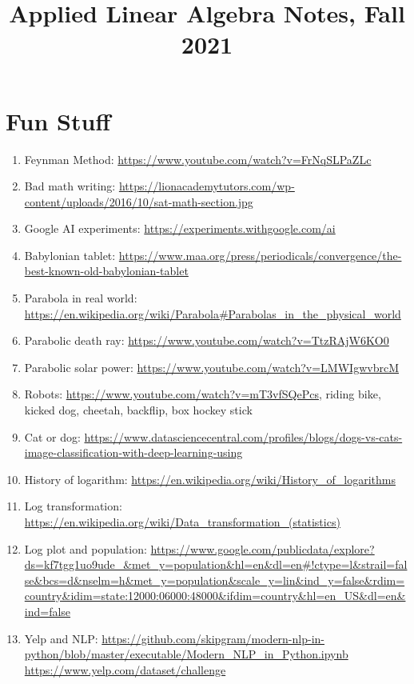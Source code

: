 \documentclass{article}
\title{Applied Linear Algebra Notes, Fall 2021}
\date
\begin{document}
\maketitle
\large


\tableofcontents


\section{Fun Stuff}

\begin{enumerate}
\item Feynman Method: \url{https://www.youtube.com/watch?v=FrNqSLPaZLc}
\item Bad math writing: \url{https://lionacademytutors.com/wp-content/uploads/2016/10/sat-math-section.jpg}
\item Google AI experiments: \url{https://experiments.withgoogle.com/ai}
\item Babylonian tablet: \url{https://www.maa.org/press/periodicals/convergence/the-best-known-old-babylonian-tablet}
\item Parabola in real world: \url{https://en.wikipedia.org/wiki/Parabola#Parabolas_in_the_physical_world}
\item Parabolic death ray: \url{https://www.youtube.com/watch?v=TtzRAjW6KO0}
\item Parabolic solar power: \url{https://www.youtube.com/watch?v=LMWIgwvbrcM}
\item Robots: \url{https://www.youtube.com/watch?v=mT3vfSQePcs}, riding bike, kicked dog, cheetah, backflip, box hockey stick
\item Cat or dog: \url{https://www.datasciencecentral.com/profiles/blogs/dogs-vs-cats-image-classification-with-deep-learning-using}
\item History of logarithm: \url{https://en.wikipedia.org/wiki/History_of_logarithms}
\item Log transformation: \url{https://en.wikipedia.org/wiki/Data_transformation_(statistics)}
\item Log plot and population: \url{https://www.google.com/publicdata/explore?ds=kf7tgg1uo9ude_&met_y=population&hl=en&dl=en#!ctype=l&strail=false&bcs=d&nselm=h&met_y=population&scale_y=lin&ind_y=false&rdim=country&idim=state:12000:06000:48000&ifdim=country&hl=en_US&dl=en&ind=false} 
\item Yelp and NLP: \url{https://github.com/skipgram/modern-nlp-in-python/blob/master/executable/Modern_NLP_in_Python.ipynb} \url{https://www.yelp.com/dataset/challenge}

\end{enumerate}
\end{document}
